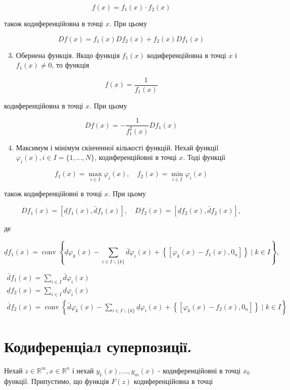 \documentclass[10pt]{article}
\begin{document}
$$
f(x)=f_{1}(x) \cdot f_{2}(x)
$$

також кодиференційовна в точці $x$. При цьому

$$
D f(x)=f_{1}(x) D f_{2}(x)+f_{2}(x) D f_{1}(x)
$$

\begin{enumerate}
  \setcounter{enumi}{2}
  \item Обернена функція. Якщо функція $f_{1}(x)$ кодиференційовна в точці $x$ і $f_{1}(x) \neq 0$, то функція
\end{enumerate}

$$
f(x)=\frac{1}{f_{1}(x)}
$$

кодиференційовна в точці $x$. При цьому

$$
D f(x)=-\frac{1}{f_{1}^{2}(x)} D f_{1}(x)
$$

\begin{enumerate}
  \setcounter{enumi}{3}
  \item Максимум і мінімум скінченної кількості функцій. Нехай функції $\varphi_{i}(x), i \in I= \{1, \ldots, N\}$, кодиференційовні в точці $x$. Тоді функції
\end{enumerate}

$$
f_{1}(x)=\max _{i \in I} \varphi_{i}(x), \quad f_{2}(x)=\min _{i \in I} \varphi_{i}(x)
$$

також кодиференційовні в точці $x$. При цьому

$$
D f_{1}(x)=\left[\underline{d} f_{1}(x), \bar{d} f_{1}(x)\right], \quad D f_{2}(x)=\left[\underline{d} f_{2}(x), \bar{d} f_{2}(x)\right],
$$

де

$$
\underline{d} f_{1}(x)=\operatorname{conv}\left\{\underline{d} \varphi_{k}(x)-\sum_{i \in I \backslash\{k\}} \bar{d} \varphi_{i}(x)+\left\{\left[\varphi_{k}(x)-f_{1}(x), 0_{n}\right]\right\} \mid k \in I\right\},
$$

$$
\begin{gathered}
\bar{d} f_{1}(x)=\sum_{i \in I} \bar{d} \varphi_{i}(x) \\
\underline{d} f_{2}(x)=\sum_{i \in I} \underline{d} \varphi_{i}(x) \\
\bar{d} f_{2}(x)=\operatorname{conv}\left\{\bar{d} \varphi_{k}(x)-\sum_{i \in I \backslash\{k\}} \underline{d} \varphi_{i}(x)+\left\{\left[\varphi_{k}(x)-f_{2}(x), 0_{n}\right]\right\} \mid k \in I\right\}
\end{gathered}
$$

\section*{Кодиференціал суперпозиції.}
Нехай $z \in \mathbb{R}^{m}, x \in \mathbb{R}^{n}$ і нехай $y_{1}(x), \ldots, y_{m}(x)$ - кодиференційовні в точці $x_{0}$ функції. Припустимо, що функція $F(z)$ кодиференційовна в точці
\end{document}
